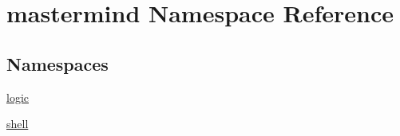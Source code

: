 \hypertarget{namespacemastermind}{}\section{mastermind Namespace Reference}
\label{namespacemastermind}
\subsection*{Namespaces}
\begin{DoxyCompactItemize}
\item 
 \hyperlink{namespacemastermind_1_1logic}{logic}
\item 
 \hyperlink{namespacemastermind_1_1shell}{shell}
\end{DoxyCompactItemize}
